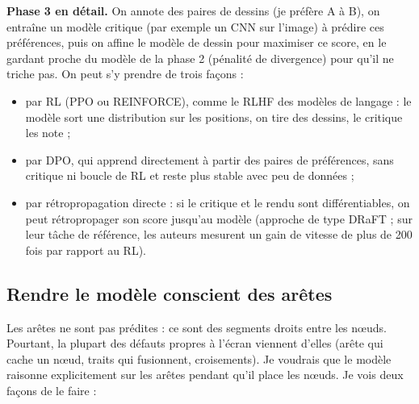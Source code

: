 \documentclass[11pt,a4paper]{article}
\begin{document}
\textbf{Phase 3 en détail.} On annote des paires de dessins (\og je préfère A à B\fg{}), on entraîne un modèle critique (par exemple un CNN sur l'image) à prédire ces préférences, puis on affine le modèle de dessin pour maximiser ce score, en le gardant proche du modèle de la phase 2 (pénalité de divergence) pour qu'il ne \og triche\fg{} pas. On peut s'y prendre de trois façons :
\begin{itemize}
  \item par RL (PPO ou REINFORCE), comme le RLHF des modèles de langage : le modèle sort une distribution sur les positions, on tire des dessins, le critique les note ;
  \item par DPO, qui apprend directement à partir des paires de préférences, sans critique ni boucle de RL et reste plus stable avec peu de données ;
  \item par rétropropagation directe : si le critique et le rendu sont différentiables, on peut rétropropager son score jusqu'au modèle (approche de type DRaFT ; sur leur tâche de référence, les auteurs mesurent un gain de vitesse de plus de 200 fois par rapport au RL).
\end{itemize}

\subsection{Rendre le modèle conscient des arêtes}\label{sec:aretes}

Les arêtes ne sont pas prédites : ce sont des segments droits entre les nœuds. Pourtant, la plupart des défauts propres à l'écran viennent d'elles (arête qui cache un nœud, traits qui fusionnent, croisements). Je voudrais que le modèle raisonne explicitement sur les arêtes pendant qu'il place les nœuds. Je vois deux façons de le faire :
\end{document}
